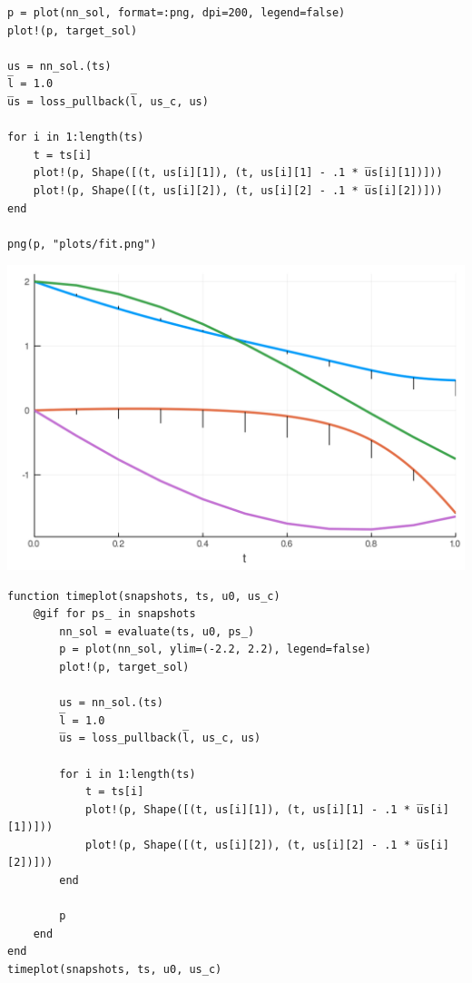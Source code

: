 \documentclass[11pt]{article}
\begin{document}
\begin{verbatim}
p = plot(nn_sol, format=:png, dpi=200, legend=false)
plot!(p, target_sol)

us = nn_sol.(ts)
l̅ = 1.0
u̅s = loss_pullback(l̅, us_c, us)

for i in 1:length(ts)
    t = ts[i]
    plot!(p, Shape([(t, us[i][1]), (t, us[i][1] - .1 * u̅s[i][1])]))
    plot!(p, Shape([(t, us[i][2]), (t, us[i][2] - .1 * u̅s[i][2])]))
end

png(p, "plots/fit.png")
\end{verbatim}

\begin{center}
\includegraphics[width=.9\linewidth]{./plots/fit.png}
\end{center}

\begin{verbatim}
function timeplot(snapshots, ts, u0, us_c)
    @gif for ps_ in snapshots
        nn_sol = evaluate(ts, u0, ps_)
        p = plot(nn_sol, ylim=(-2.2, 2.2), legend=false)
        plot!(p, target_sol)

        us = nn_sol.(ts)
        l̅ = 1.0
        u̅s = loss_pullback(l̅, us_c, us)

        for i in 1:length(ts)
            t = ts[i]
            plot!(p, Shape([(t, us[i][1]), (t, us[i][1] - .1 * u̅s[i][1])]))
            plot!(p, Shape([(t, us[i][2]), (t, us[i][2] - .1 * u̅s[i][2])]))
        end

        p
    end
end
timeplot(snapshots, ts, u0, us_c)
\end{verbatim}
\end{document}
